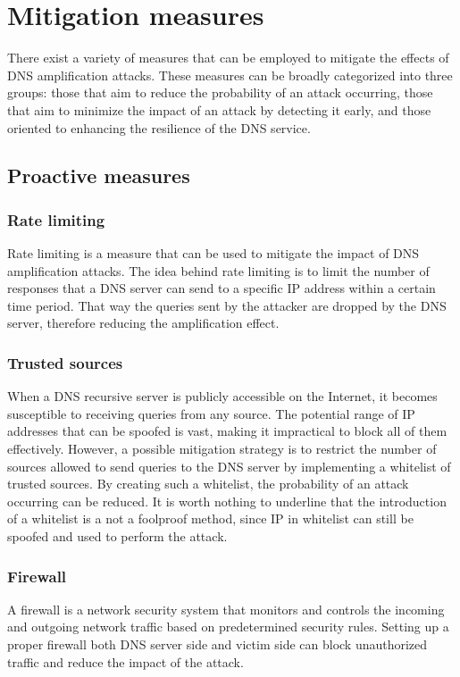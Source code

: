 \section{Mitigation measures}
There exist a variety of measures that can be employed to mitigate the effects of DNS amplification attacks. 
These measures can be broadly categorized into three groups: those that aim to reduce the probability of an attack occurring, 
those that aim to minimize the impact of an attack by detecting it early, and those oriented to enhancing the resilience of the DNS service.

\subsection*{Proactive measures}
\subsubsection*{Rate limiting}
Rate limiting is a measure that can be used to mitigate the impact of DNS amplification attacks. The idea behind rate limiting is to limit 
the number of responses that a DNS server can send to a specific IP address within a certain time period. That way the queries sent
by the attacker are dropped by the DNS server, therefore reducing the amplification effect.

\subsubsection*{Trusted sources}
When a DNS recursive server is publicly accessible on the Internet, it becomes susceptible to receiving queries from any source. 
The potential range of IP addresses that can be spoofed is vast, making it impractical to block all of them effectively. However, a 
possible mitigation strategy is to restrict the number of sources allowed to send queries to the DNS server by implementing a whitelist of trusted 
sources. By creating such a whitelist, the probability of an attack occurring can be reduced. It is worth nothing to underline that 
the introduction of a whitelist is a not a foolproof method, since IP in whitelist can still be spoofed and used to perform the attack.

\subsubsection*{Firewall}
A firewall is a network security system that monitors and controls the incoming and outgoing network traffic based on predetermined security
rules. Setting up a proper firewall both DNS server side and victim side can block unauthorized traffic and reduce the impact of the attack.

